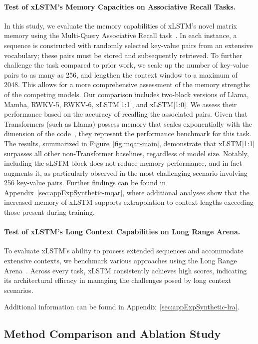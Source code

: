 \paragraph{Test of xLSTM's Memory Capacities on Associative Recall Tasks.} In this study, we evaluate the memory capabilities of xLSTM’s novel matrix memory using the Multi-Query Associative Recall task~\citep{Arora:23arxiv}. In each instance, a sequence is constructed with randomly selected key-value pairs from an extensive vocabulary; these pairs must be stored and subsequently retrieved. To further challenge the task compared to prior work, we scale up the number of key-value pairs to as many as 256, and lengthen the context window to a maximum of 2048. This allows for a more comprehensive assessment of the memory strengths of the competing models. Our comparison includes two-block versions of Llama, Mamba, RWKV-5, RWKV-6, xLSTM[1:1], and xLSTM[1:0]. We assess their performance based on the accuracy of recalling the associated pairs. Given that Transformers (such as Llama) possess memory that scales exponentially with the dimension of the code~\citep{Ramsauer:21}, they represent the performance benchmark for this task. The results, summarized in Figure~\ref{fig:mqar-main}, demonstrate that xLSTM[1:1] surpasses all other non-Transformer baselines, regardless of model size. Notably, including the sLSTM block does not reduce memory performance, and in fact augments it, as particularly observed in the most challenging scenario involving 256 key-value pairs. Further findings can be found in Appendix~\ref{sec:appExpSynthetic-mqar}, where additional analyses show that the increased memory of xLSTM supports extrapolation to context lengths exceeding those present during training.

\paragraph{Test of xLSTM's Long Context Capabilities on Long Range Arena.} To evaluate xLSTM's ability to process extended sequences and accommodate extensive contexts, we benchmark various approaches using the Long Range Arena~\citep{Tay:21}. Across every task, xLSTM consistently achieves high scores, indicating its architectural efficacy in managing the challenges posed by long context scenarios.

Additional information can be found in Appendix~\ref{sec:appExpSynthetic-lra}.

\subsection{Method Comparison and Ablation Study}
\label{sec:ExpComparison}

